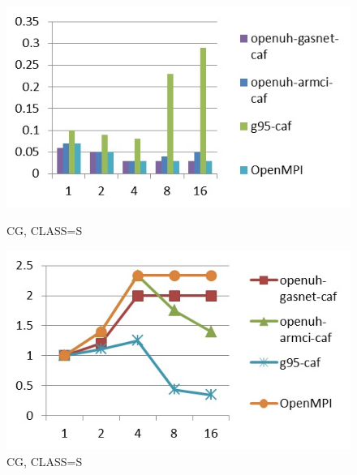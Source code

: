 \begin{figure}[ht]
\begin{minipage}[b]{0.45\linewidth}
\centering
\includegraphics[width=\textwidth]{./figures/cg_S_time.jpg}
\caption{CG, CLASS=S}
\label{fig:figure1}
\end{minipage}
\hspace{0.5cm}
\begin{minipage}[b]{0.45\linewidth}
\centering
\includegraphics[width=\textwidth]{./figures/cg_S_scalability.jpg}
\caption{CG, CLASS=S}
\label{fig:figure2}
\end{minipage}
\end{figure}


